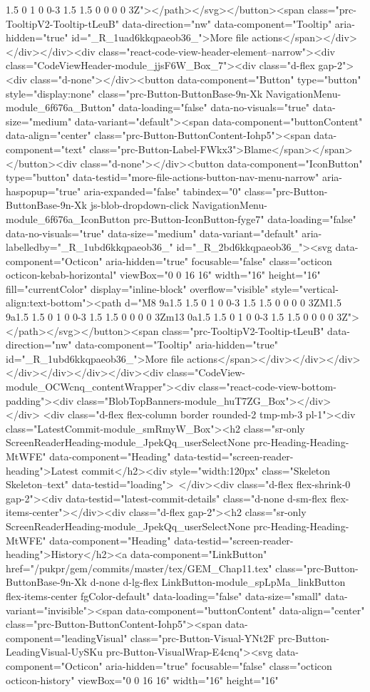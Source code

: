 1.5 0 1 0 0-3 1.5 1.5 0 0 0 0 3Z"></path></svg></button><span class="prc-TooltipV2-Tooltip-tLeuB" data-direction="nw" data-component="Tooltip" aria-hidden="true" id="_R_1uad6kkqpaeob36_">More file actions</span></div></div></div><div class="react-code-view-header-element--narrow"><div class="CodeViewHeader-module_jjsF6W_Box_7"><div class="d-flex gap-2"><div class="d-none"></div><button data-component="Button" type="button" style="display:none" class="prc-Button-ButtonBase-9n-Xk NavigationMenu-module_6f676a_Button" data-loading="false" data-no-visuals="true" data-size="medium" data-variant="default"><span data-component="buttonContent" data-align="center" class="prc-Button-ButtonContent-Iohp5"><span data-component="text" class="prc-Button-Label-FWkx3">Blame</span></span></button><div class="d-none"></div><button data-component="IconButton" type="button" data-testid="more-file-actions-button-nav-menu-narrow" aria-haspopup="true" aria-expanded="false" tabindex="0" class="prc-Button-ButtonBase-9n-Xk js-blob-dropdown-click NavigationMenu-module_6f676a_IconButton prc-Button-IconButton-fyge7" data-loading="false" data-no-visuals="true" data-size="medium" data-variant="default" aria-labelledby="_R_1ubd6kkqpaeob36_" id="_R_2bd6kkqpaeob36_"><svg data-component="Octicon" aria-hidden="true" focusable="false" class="octicon octicon-kebab-horizontal" viewBox="0 0 16 16" width="16" height="16" fill="currentColor" display="inline-block" overflow="visible" style="vertical-align:text-bottom"><path d="M8 9a1.5 1.5 0 1 0 0-3 1.5 1.5 0 0 0 0 3ZM1.5 9a1.5 1.5 0 1 0 0-3 1.5 1.5 0 0 0 0 3Zm13 0a1.5 1.5 0 1 0 0-3 1.5 1.5 0 0 0 0 3Z"></path></svg></button><span class="prc-TooltipV2-Tooltip-tLeuB" data-direction="nw" data-component="Tooltip" aria-hidden="true" id="_R_1ubd6kkqpaeob36_">More file actions</span></div></div></div></div></div></div></div><div class="CodeView-module_OCWcnq_contentWrapper"><div class="react-code-view-bottom-padding"><div class="BlobTopBanners-module_huT7ZG_Box"></div></div> <div class="d-flex flex-column border rounded-2 tmp-mb-3 pl-1"><div class="LatestCommit-module_smRmyW_Box"><h2 class="sr-only ScreenReaderHeading-module_JpekQq_userSelectNone prc-Heading-Heading-MtWFE" data-component="Heading" data-testid="screen-reader-heading">Latest commit</h2><div style="width:120px" class="Skeleton Skeleton--text" data-testid="loading"> </div><div class="d-flex flex-shrink-0 gap-2"><div data-testid="latest-commit-details" class="d-none d-sm-flex flex-items-center"></div><div class="d-flex gap-2"><h2 class="sr-only ScreenReaderHeading-module_JpekQq_userSelectNone prc-Heading-Heading-MtWFE" data-component="Heading" data-testid="screen-reader-heading">History</h2><a data-component="LinkButton" href="/pukpr/gem/commits/master/tex/GEM_Chap11.tex" class="prc-Button-ButtonBase-9n-Xk d-none d-lg-flex LinkButton-module_spLpMa_linkButton flex-items-center fgColor-default" data-loading="false" data-size="small" data-variant="invisible"><span data-component="buttonContent" data-align="center" class="prc-Button-ButtonContent-Iohp5"><span data-component="leadingVisual" class="prc-Button-Visual-YNt2F prc-Button-LeadingVisual-UySKu prc-Button-VisualWrap-E4cnq"><svg data-component="Octicon" aria-hidden="true" focusable="false" class="octicon octicon-history" viewBox="0 0 16 16" width="16" height="16" 